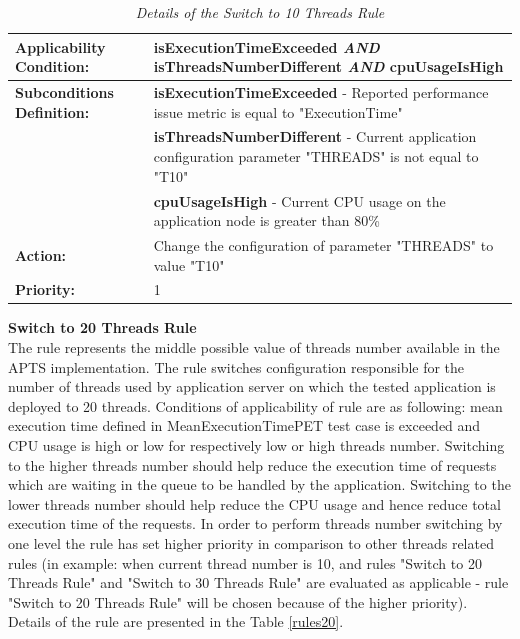 \documentclass[12pt,a4paper]{article}
\begin{document}
\begin{table}[!htb]
\begin{center}
\begin{tabularx}{\textwidth}{l|X}

\textbf{Applicability Condition:} & \textbf{isExecutionTimeExceeded} \textit{AND} \newline
\textbf{isThreadsNumberDifferent} \textit{AND} \newline
\textbf{cpuUsageIsHigh} \\ \hline

\textbf{Subconditions Definition:} & \textbf{isExecutionTimeExceeded} -  Reported performance issue metric is equal to "ExecutionTime"  \\
& \textbf{isThreadsNumberDifferent} -  Current application configuration parameter "THREADS" is not equal to "T10" \\
& \textbf{cpuUsageIsHigh} - Current CPU usage on the application node is greater than 80\% \\ \hline

\textbf{Action:} & Change the configuration of parameter "THREADS" to value "T10" \\ \hline
\textbf{Priority:} & 1\\
\end{tabularx}
\end{center}
\caption{\textit{Details of the Switch to 10 Threads Rule}} \label{rules10}
\end{table}
\vspace{5mm}
\noindent\textbf{Switch to 20 Threads Rule} \\
The rule represents the middle possible value of threads number available in the APTS implementation. The rule switches configuration responsible for the number of threads used by application server on which the tested application is deployed to 20 threads. Conditions of applicability of rule are as following: mean execution time defined in MeanExecutionTimePET test case is exceeded and CPU usage is high or low for respectively low or high threads number. Switching to the higher threads number should help reduce the execution time of requests which are waiting in the queue to be handled by the application. Switching to the lower threads number should help reduce the CPU usage and hence reduce total execution time of the requests. In order to perform threads number switching by one level the rule has set higher priority in comparison to other threads related rules (in example: when current thread number is 10, and rules "Switch to 20 Threads Rule" and "Switch to 30 Threads Rule" are evaluated as applicable - rule "Switch to 20 Threads Rule" will be chosen because of the higher priority). Details of the rule are presented in the Table \ref{rules20}.
\end{document}
